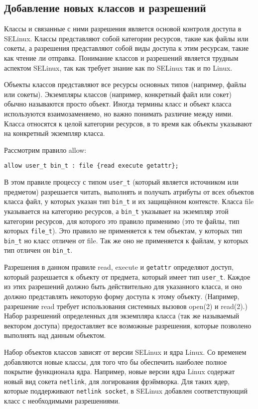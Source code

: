 \documentclass{./../class/UIR}
\begin{document}
\subsection{Добавление новых классов и разрешений}
    Классы и связанные с ними разрешения является основой контроля доступа в SELinux. Классы представляют собой категории ресурсов, такие как файлы или сокеты, а разрешения представляют собой виды доступа к этим ресурсам, такие как чтение ли отправка. Понимание классов и разрешений является трудным аспектом SELinux, так как требует знание как по SELinux так и по Linux.

	Объекты классов представляют все ресурсы основных типов (например, файлы или
	сокеты). Экземпляры классов (например, конкретный файл или сокет) обычно
	называются просто объект. Иногда термины класс и объект класса используются
	взаимозаменяемо, но важно понимать различие между ними. Класса относятся к
	целой категории ресурсов, в то время как объекты указывают на конкретный
	экземпляр класса.
	
	Рассмотрим правило allow:
	\begin{verbatim}
allow user_t bin_t : file {read execute getattr};
	\end{verbatim}
	В этом правиле процессу с типом \verb"user_t" (который является источником или
	предметом) разрешается читать, выполнять и получать атрибуты от всех объектов
	класса файл, у которых указан тип \verb"bin_t" и их защищённом контексте.
	Класса file указывается на категорию ресурсов, а \verb"bin_t" указывает на экземпляр этой
	категории ресурсов, для которого это правило применимо (это те файлы, тип
	которых \verb"file_t"). Это правило не применяется к тем объектам, у которых
	тип \verb"bin_t" но класс отличен от file. Так же оно не применяется к файлам, у
	которых тип отличен он \verb"bin_t".
	
	Разрешения в данном правиле read, execute и \verb"getattr" определяют доступ,
	который разрешается к объекту от предмета, который имеет тип \verb"user_t".
	Каждое из этих разрешений должно быть действительно для указанного класса, и оно должно
	представлять некоторую форму доступа к этому объекту. (Например, разрешение
	read требует использования системных вызовов open(2) и read(2).) Набор
	разрешений определенных для экземпляра класса (так же называемый вектором
	доступа) предоставляет все возможные разрешения, которые позволено выполнять
	над данным объектом.
	
	Набор объектов классов зависят от версии SELinux и ядра Linux. Со временем
	добавляются новые классы, для того что бы обеспечить наиболее полное покрытие
	функционала ядра. Например, новые версии ядра Linux содержат новый вид сокета
	\verb"netlink", для логирования фрэймворка. Для таких ядер, которые
	поддерживают \verb"netlink socket", в SELinux добавлен соответствующий класс с
	необходимыми разрешениями.
	
\end{document}
